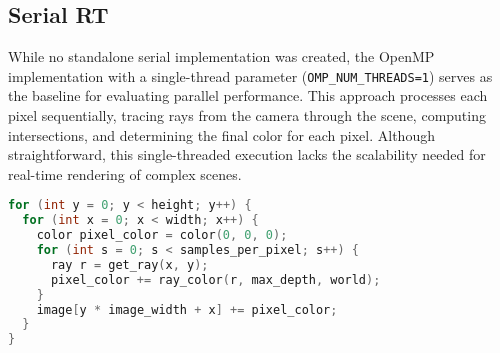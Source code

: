 \subsection{Serial RT}
\label{subsec:serial-rt}
While no standalone serial implementation was created, the OpenMP implementation with a single-thread parameter (\texttt{OMP\_NUM\_THREADS=1}) serves as the baseline for evaluating parallel performance. This approach processes each pixel sequentially, tracing rays from the camera through the scene, computing intersections, and determining the final color for each pixel. Although straightforward, this single-threaded execution lacks the scalability needed for real-time rendering of complex scenes.

\begin{lstlisting}[caption={\textbf{Serial RT:} The baseline implementation computes the color of each pixel by casting multiple rays per pixel (antialiasing) and aggregating their contributions. Each pixel's color is computed independently.}, label={listing:serial-rt}, name=serial-rt, float=htbp, style=mystyle, language=C++]
for (int y = 0; y < height; y++) {
  for (int x = 0; x < width; x++) {
    color pixel_color = color(0, 0, 0);
    for (int s = 0; s < samples_per_pixel; s++) {
      ray r = get_ray(x, y);
      pixel_color += ray_color(r, max_depth, world);
    }
    image[y * image_width + x] += pixel_color;
  }
}
\end{lstlisting}
